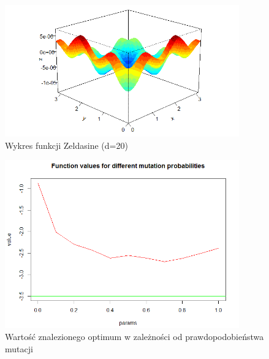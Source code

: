 \documentclass[11pt, a4paper]{article}
\begin{document}
\begin{figure}[H]
	\begin{center}
		\includegraphics[width=0.9\textwidth]{./assets/Zeldasine1.png} %
		\caption{Wykres funkcji Zeldasine (d=20)}
		\label{fig:zeldasine1}
	\end{center}
\end{figure}

\begin{figure}[H]
	\begin{center}
		\includegraphics[width=0.9\textwidth]{./assets/Zeldasine2.png} %
		\caption{Wartość znalezionego optimum w zależności od prawdopodobieństwa mutacji}
		\label{fig:zeldasine2}
	\end{center}
\end{figure}
\end{document}
